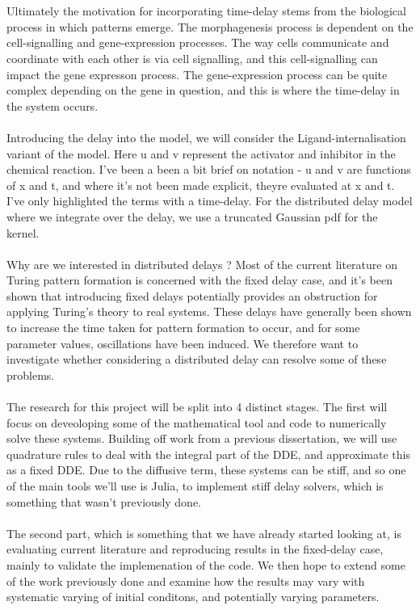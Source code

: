 \documentclass{article}
\begin{document}
\\\\
Ultimately the motivation for incorporating time-delay stems from the biological process in which patterns emerge. The morphagenesis process is dependent on the cell-signalling and gene-expression processes. The way cells communicate and coordinate with each other is via cell signalling, and this cell-signalling can impact the gene expresson process. The gene-expression process can be quite complex depending on the gene in question, and this is where the time-delay in the system occurs.
\\\\
Introducing the delay into the model, we will consider the Ligand-internalisation variant of the model. Here u and v represent the activator and inhibitor in the chemical reaction. I've been a been a bit brief on notation - u and v are functions of x and t, and where it's not been made explicit, theyre evaluated at x and t. I've only highlighted the terms with a time-delay.
For the distributed delay model where we integrate over the delay, we use a truncated Gaussian pdf for the kernel.
\\\\
Why are we interested in distributed delays ? Most of the current literature on Turing pattern formation is concerned with the fixed delay case, and it's been shown that introducing fixed delays potentially provides an obstruction for applying Turing's theory to real systems. These delays have generally been shown to increase the time taken for pattern formation to occur, and for some parameter values, oscillations have been induced. We therefore want to investigate whether considering a distributed delay can resolve some of these problems.
\\\\
The research for this project will be split into 4 distinct stages. The first will focus on deveoloping some of the mathematical tool and code to numerically solve these systems. Building off work from a previous dissertation, we will use quadrature rules to deal with the integral part of the DDE, and approximate this as a fixed DDE. Due to the diffusive term, these systems can be stiff, and so
one of the main tools we'll use is Julia, to implement stiff delay solvers, which is something that wasn't previously done.
\\\\
The second part, which is something that we have already started looking at, is evaluating current literature and reproducing results in the fixed-delay case, mainly to validate the implemenation of the code. We then hope to extend some of the work previously done and examine how the results may vary with systematic varying of initial conditons, and potentially varying parameters.
\end{document}

